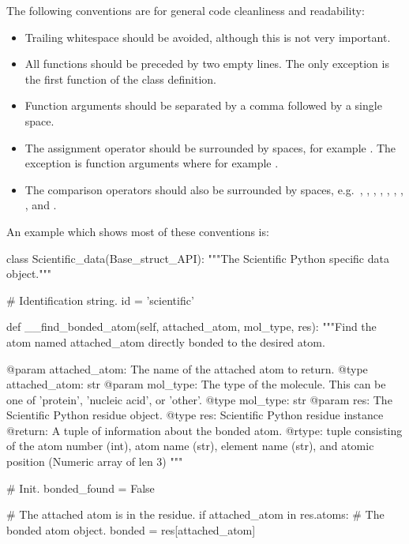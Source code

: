 The following conventions are for general code cleanliness and readability:

\begin{itemize}
\item Trailing whitespace should be avoided, although this is not very important.
\item All functions should be preceded by two empty lines.  The only exception is the first function of the class definition.
\item Function arguments should be separated by a comma followed by a single space.
\item The assignment operator should be surrounded by spaces, for example .  The exception is function arguments where for example .
\item The comparison operators should also be surrounded by spaces, e.g.\ \pycodestar{ < }, \pycodestar{ > }, \pycodestar{ == }, \pycodestar{ <= }, \pycodestar{ => }, \pycodestar{ <> }, \pycodestar{ != }, , and .
\end{itemize}

An example which shows most of these conventions is:
\begin{footnotesize}
\begin{verbatim*}
class Scientific_data(Base_struct_API):
    """The Scientific Python specific data object."""

    # Identification string.
    id = 'scientific'


    def __find_bonded_atom(self, attached_atom, mol_type, res):
        """Find the atom named attached_atom directly bonded to the desired atom.

        @param attached_atom:   The name of the attached atom to return.
        @type attached_atom:    str
        @param mol_type:        The type of the molecule.  This can be one of 'protein', 'nucleic acid',
                                or 'other'.
        @type mol_type:         str
        @param res:             The Scientific Python residue object.
        @type res:              Scientific Python residue instance
        @return:                A tuple of information about the bonded atom.
        @rtype:                 tuple consisting of the atom number (int), atom name (str), element
                                name (str), and atomic position (Numeric array of len 3)
        """

        # Init.
        bonded_found = False

        # The attached atom is in the residue.
        if attached_atom in res.atoms:
            # The bonded atom object.
            bonded = res[attached_atom]
\end{verbatim*}
\end{footnotesize}



